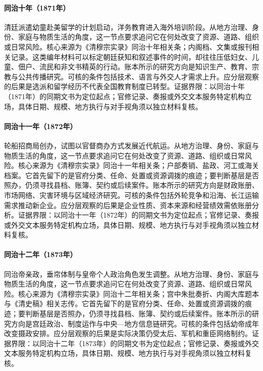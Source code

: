 \hypertarget{social:EQ-1871-QING-STUDENTS-ABROAD}{}\paragraph{同治十年（1871年）}清廷派遣幼童赴美留学的计划启动，洋务教育进入海外培训阶段。从地方治理、身份、家庭与物质生活的角度，这一节点要求追问它在何处改变了资源、道路、组织或日常风险。核心来源为《清穆宗实录》同治十年相关条；内阁档、文集或报刊相关记录。这类编年材料可以标定朝廷获知和叙述事件的时间，却往往压低妇女、儿童、佃户、流民和非文书精英的行动。账本所示的研究方向是知识生产、教育、宗教与公共传播研究。可核的条件包括技术、语言与外交人才需求上升。应分层观察的后果是选派和留学经历不代表全国教育制度已转型。证据界限：以同治十年（1871年）的同期文书为定位起点；官修记录、奏报或外交文本服务特定机构立场，具体日期、规模、地方执行与对手视角须以独立材料复核。
\hypertarget{social:EQ-1872-CHINA-MERCHANTS-STEAM-NAVIGATION}{}\paragraph{同治十一年（1872年）}轮船招商局创办，试图以官督商办方式发展近代航运。从地方治理、身份、家庭与物质生活的角度，这一节点要求追问它在何处改变了资源、道路、组织或日常风险。核心来源为《清穆宗实录》同治十一年相关条；户部奏销、盐政、河工或海关档案。它首先留下的是官府分类、任命、处置或资源调拨的痕迹；要判断基层是否照办，仍须寻找县档、账簿、契约或后续案件。账本所示的研究方向是财政账册、市场网络、灾害环境与区域经济研究。可核的条件包括外轮竞争和沿海、长江运输需求推动新企业。应分层观察的后果是企业性质、资本来源和经营绩效需依账册分析。证据界限：以同治十一年（1872年）的同期文书为定位起点；官修记录、奏报或外交文本服务特定机构立场，具体日期、规模、地方执行与对手视角须以独立材料复核。
\hypertarget{social:EQ-1873-TONGZHI-EMPEROR-REIGN}{}\paragraph{同治十二年（1873年）}同治帝亲政，垂帘体制与皇帝个人政治角色发生调整。从地方治理、身份、家庭与物质生活的角度，这一节点要求追问它在何处改变了资源、道路、组织或日常风险。核心来源为《清穆宗实录》同治十二年相关条；宫中朱批奏折、内阁大库题本与《清史稿》相关志传。它首先留下的是官府分类、任命、处置或资源调拨的痕迹；要判断基层是否照办，仍须寻找县档、账簿、契约或后续案件。账本所示的研究方向是宫廷政治、制度运作与中央—地方信息链研究。可核的条件包括幼帝成年改变摄政安排。应分层观察的后果是实际决策仍受太后、军机和重臣网络制约。证据界限：以同治十二年（1873年）的同期文书为定位起点；官修记录、奏报或外交文本服务特定机构立场，具体日期、规模、地方执行与对手视角须以独立材料复核。
